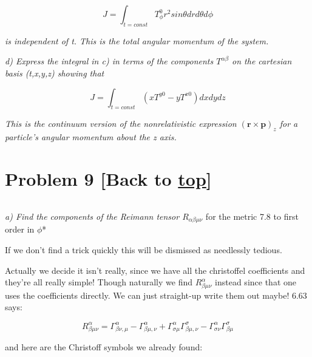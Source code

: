 \documentclass[landscape,letterpaper,10pt,english]{article}
\begin{document}
\[ J = \int_{t=const} T^0_\phi r^2sin\theta drd\theta d\phi\]

\emph{is independent of t. This is the total angular momentum of the
system.}

    \emph{d) Express the integral in c) in terms of the components
\(T^{\alpha\beta}\) on the cartesian basis (t,x,y,z) showing that}

\[ J = \int_{t=const} (xT^{y0}-yT^{x0}) dxdydz\]

\emph{This is the continuum version of the nonrelativistic expression
\((\textbf{r} \times \textbf{p})_z\) for a particle's angular momentum
about the z axis.}

    \hypertarget{problem-9-back-to-top}{%
\section{\texorpdfstring{Problem 9 {[}Back to
\hyperref[toc]{top}{]}}{Problem 9 {[}Back to {]}}}\label{problem-9-back-to-top}}

\[\label{P9}\]

\emph{a) Find the components of the Reimann tensor
\(R_{\alpha\beta\mu\nu}\)} for the metric 7.8 to first order in
\(\phi\)*

If we don't find a trick quickly this will be dismissed as needlessly
tedious.

Actually we decide it isn't really, since we have all the christoffel
coefficients and they're all really simple! Though naturally we find
\(R^{\alpha}_{\beta\mu\nu}\) instead since that one uses the
coefficients directly. We can just straight-up write them out maybe!
6.63 says:

\[ R^\alpha_{\beta\mu\nu} = \Gamma^\alpha_{\beta\nu,\mu} - \Gamma^\alpha_{\beta\mu,\nu} + \Gamma^\alpha_{\sigma\mu}\Gamma^\sigma_{\beta\mu,\nu} - \Gamma^\alpha_{\sigma\nu}\Gamma^\sigma_{\beta\mu} \]

and here are the Christoff symbols we already found:
\end{document}
